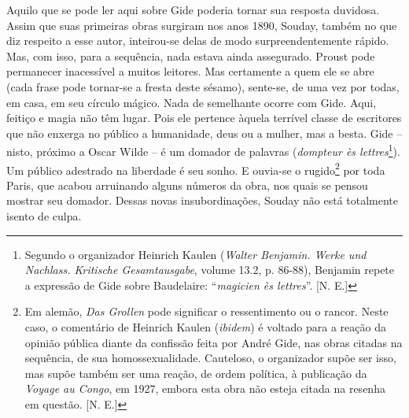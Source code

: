 Aquilo que se pode ler aqui sobre Gide poderia tornar sua resposta
duvidosa. Assim que suas primeiras obras surgiram nos anos 1890, Souday,
também no que diz respeito a esse autor, inteirou-se delas de modo
surpreendentemente rápido. Mas, com isso, para a sequência, nada estava
ainda assegurado. Proust pode permanecer inacessível a muitos leitores.
Mas certamente a quem ele se abre (cada frase pode tornar-se a fresta
deste sésamo), sente-se, de uma vez por todas, em casa, em seu círculo
mágico. Nada de semelhante ocorre com Gide. Aqui, feitiço e magia não
têm lugar. Pois ele pertence àquela terrível classe de escritores que
não enxerga no público a humanidade, deus ou a mulher, mas a besta. Gide
-- nisto, próximo a Oscar Wilde -- é um domador de palavras
(\emph{dompteur ès lettres}\footnote{Segundo o organizador Heinrich
  Kaulen (\emph{Walter Benjamin. Werke und Nachlass. Kritische
  Gesamtausgabe}, volume 13.2, p. 86-88), Benjamin repete a expressão de
  Gide sobre Baudelaire: ``\emph{magicien ès lettres}''. {[}N. E.{]}}).
Um público adestrado na liberdade é seu sonho. E ouvia-se o
rugido\footnote{Em alemão, \emph{Das Grollen} pode significar o
  ressentimento ou o rancor. Neste caso, o comentário de Heinrich Kaulen
  (\emph{ibidem}) é voltado para a reação da opinião pública diante da
  confissão feita por André Gide, nas obras citadas na sequência, de sua
  homossexualidade. Cauteloso, o organizador supõe ser isso, mas supõe
  também ser uma reação, de ordem política, à publicação da \emph{Voyage
  au Congo}, em 1927, embora esta obra não esteja citada na resenha em
  questão. {[}N. E.{]}} por toda Paris, que acabou arruinando alguns
números da obra, nos quais se pensou mostrar seu domador. Dessas novas
insubordinações, Souday não está totalmente isento de culpa.

